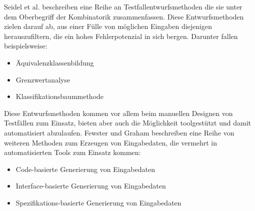 Seidel et al. \cite[vgl. S. 27]{seidl_basiswissen_2012} beschreiben eine Reihe an Testfallentwurfsmethoden die sie unter dem Oberbegriff der Kombinatorik zusammenfassen. Diese Entwurfsmethoden zielen darauf ab, aus einer Fülle von möglichen Eingaben diejenigen herauszufiltern, die ein hohes Fehlerpotenzial in sich bergen. Darunter fallen beispielsweise:
\begin{itemize}
\item Äquivalenzklassenbildung
\item Grenzwertanalyse
\item Klassifikationsbaummethode
\end{itemize}
Diese Entwurfsmethoden kommen vor allem beim manuellen Designen von Testfällen zum Einsatz, bieten aber auch die Möglichkeit toolgestützt und damit automatisiert abzulaufen.
Fewster und Graham \cite[vgl. S. 19 ff.]{fewster_software_1999} beschreiben eine Reihe von weiteren Methoden zum Erzeugen von Eingabedaten, die vermehrt in automatisierten Tools zum Einsatz kommen:
\begin{itemize}
\item Code-basierte Generierung von Eingabedaten
\item Interface-basierte Generierung von Eingabedaten
\item Spezifikations-basierte Generierung von Eingabedaten
\end{itemize}

